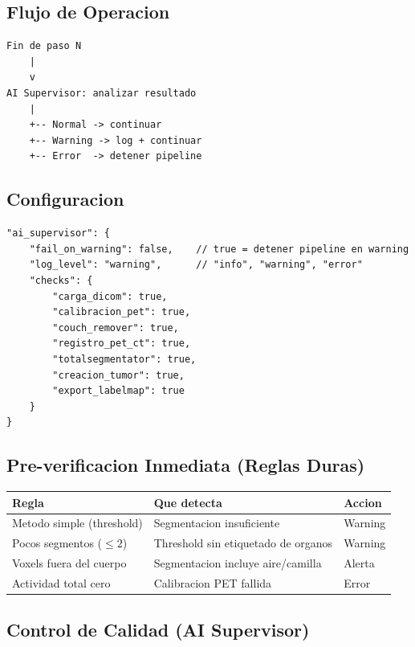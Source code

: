 \documentclass[12pt,a4paper]{article}
\begin{document}
\subsection{Flujo de Operacion}

\begin{verbatim}
Fin de paso N
    |
    v
AI Supervisor: analizar resultado
    |
    +-- Normal -> continuar
    +-- Warning -> log + continuar
    +-- Error  -> detener pipeline
\end{verbatim}

\subsection{Configuracion}

\begin{verbatim}
"ai_supervisor": {
    "fail_on_warning": false,    // true = detener pipeline en warning
    "log_level": "warning",      // "info", "warning", "error"
    "checks": {
        "carga_dicom": true,
        "calibracion_pet": true,
        "couch_remover": true,
        "registro_pet_ct": true,
        "totalsegmentator": true,
        "creacion_tumor": true,
        "export_labelmap": true
    }
}
\end{verbatim}

\subsection{Pre-verificacion Inmediata (Reglas Duras)}

\begin{table}[H]
\centering
\begin{tabular}{l l l}
\toprule
\textbf{Regla} & \textbf{Que detecta} & \textbf{Accion} \\
\midrule
Metodo simple (threshold) & Segmentacion insuficiente & Warning \\
Pocos segmentos ($\leq 2$) & Threshold sin etiquetado de organos & Warning \\
Voxels fuera del cuerpo & Segmentacion incluye aire/camilla & Alerta \\
Actividad total cero & Calibracion PET fallida & Error \\
\bottomrule
\end{tabular}
\end{table}

\subsection{Control de Calidad (AI Supervisor)}
\end{document}
